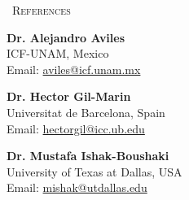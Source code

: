 \prefixmarker{}
\begin{rubric}{\faAddressBook\ \textsc{References}}
\entry*[]%
\begin{multicols}{3}

\begin{minipage}{\linewidth}
\textbf{Dr. Alejandro Aviles} \\
ICF-UNAM, Mexico \\
Email: \url{aviles@icf.unam.mx }
\end{minipage}

\begin{minipage}{\linewidth}
\textbf{Dr. Hector Gil-Marin} \\
Universitat de Barcelona, Spain \\
Email: \url{hectorgil@icc.ub.edu}
\end{minipage}

\begin{minipage}{\linewidth}
\textbf{Dr. Mustafa Ishak-Boushaki} \\
University of Texas at Dallas, USA \\
Email: \url{mishak@utdallas.edu}
\end{minipage}

\end{multicols}\par
\end{rubric}
